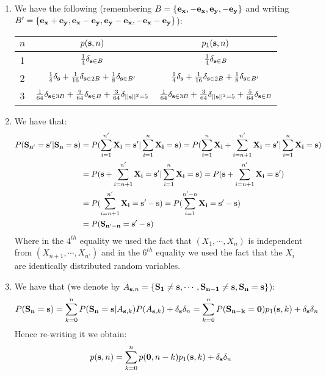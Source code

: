 \documentclass[10pt,a4paper]{article}
\begin{document}
\begin{enumerate}
\item We have the following (remembering $B = \{\vb{e_x}, -\vb{e_x}, \vb{e_y}, -\vb{e_y}\}$ and writing $B' = \{\vb{e_x} + \vb{e_y}, \vb{e_x} - \vb{e_y}, \vb{e_y} - \vb{e_x}, -\vb{e_x} - \vb{e_y}\}$):
\begin{center}
\begin{tabular}{c | c | c |}
$n$ & $p(\vb{s}, n)$ & $p_1(\vb{s}, n)$\\
\hline
1 & $\frac{1}{4}\delta_{\vb{s} \in B}$ & $\frac{1}{4} \delta_{\vb{s} \in B}$ \\
\hline
2 & $\frac{1}{4} \delta_{\vb{s}} + \frac{1}{16} \delta_{\vb{s} \in 2 B} + \frac{1}{8} \delta_{\vb{s} \in B'}$ & $\frac{1}{4} \delta_{\vb{s}} + \frac{1}{16} \delta_{\vb{s} \in 2B} + \frac{1}{8} \delta_{\vb{s} \in B'}$ \\
\hline
3 & $ \frac{1}{64} \delta_{\vb{s} \in 3 B} + \frac{9}{64} \delta_{\vb{s} \in B} + \frac{3}{64} \delta_{||\vb{s}||^2 = 5} $ & $\frac{1}{64} \delta_{\vb{s} \in 3B} + \frac{3}{64} \delta_{||\vb{s}||^2 =  5} + \frac{5}{64} \delta_{\vb{s} \in B}$  
\end{tabular}
\end{center}

\item We have that:
\begin{align*}
P(\vb{S_{n'}} = \vb{s'} | \vb{S_n} = \vb{s}) &= P(\sum_{i = 1}^{n'} \vb{X_i} = \vb{s'} | \sum_{i = 1}^n \vb{X_i} = \vb{s}) = P(\sum_{i = 1}^{n} \vb{X_i} + \sum_{i = n +1}^{n'} \vb{X_i} = \vb{s'} | \sum_{i = 1}^n \vb{X_i} = \vb{s})\\
&= P(\vb{s} + \sum_{i = n+1}^{n'} \vb{X_i} = \vb{s'} | \sum_{i = 1}^n \vb{X_i} = \vb{s}) = P(\vb{s} + \sum_{i = n+1}^{n'} \vb{X_i} = \vb{s'} )\\
&= P(\sum_{i = n+1}^{n'} \vb{X_i} = \vb{s'} - \vb{s}) = P(\sum_{i = 1}^{n' - n} \vb{X_i} = \vb{s'} - \vb{s})\\
&= P(\vb{S_{n' - n}} = \vb{s'} - \vb{s})
\end{align*}
Where in the $4^{th}$ equality we used the fact that $(X_1, \cdots, X_n)$ is independent from $(X_{n+1}, \cdots, X_{n'})$ and in the $6^{th}$ equality we used the fact that the $X_i$ are identically distributed random variables. 

\item We have that (we denote by $A_{\vb{s}, n} = \{\vb{S_1} \neq \vb{s}, \cdots, \vb{S_{n-1}} \neq \vb{s}, \vb{S_n} = \vb{s}\}$):
\[
P(\vb{S_n} = \vb{s}) = \sum_{k = 0}^n P(\vb{S_n} = \vb{s} | A_{\vb{s}, k}) P(A_{\vb{s}, k}) + \delta_{\vb{s}} \delta_n = \sum_{k = 0}^n P(\vb{S_{n - k}} = \vb{0}) p_1(\vb{s}, k) + \delta_{\vb{s}} \delta_n
\]
Hence re-writing it we obtain:
\[
p(\vb{s}, n) = \sum_{k = 0}^n p(\vb{0}, n - k) p_1(\vb{s}, k) + \delta_{\vb{s}} \delta_n
\]


\end{enumerate}
\end{document}
